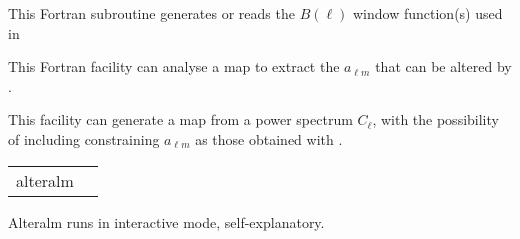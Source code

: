 \begin{support}
  \begin{sulist}{} %
  \item[\htmlref{generate\_beam}{sub:generate_beam}] This \healpix Fortran
subroutine generates or reads the $B(\ell)$ window function(s) used in \thedocid
  \item[\htmlref{anafast}{fac:anafast}] This \healpix Fortran facility can
     	       analyse a \healpix map to extract the $a_{\ell m}$ that can be
     	       altered by \thedocid.
  \item[\htmlref{synfast}{fac:synfast}] This \healpix facility can generate a
  \healpix map from a power spectrum $C_\ell$, with the possibility of including
  constraining $a_{\ell m}$ as those obtained with \thedocid.
		
  \end{sulist}
\end{support}

\begin{examples}{1}
{
\begin{tabular}{ll} %
alteralm  \\
\end{tabular}
}
{
Alteralm runs in interactive mode, self-explanatory.
}
\end{examples}


